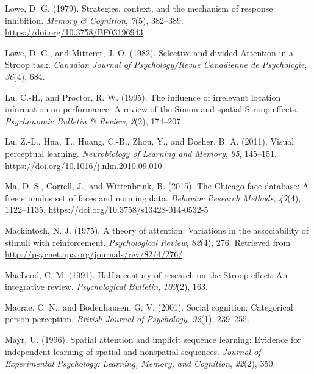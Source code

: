 \documentclass[]{DissertateCUNY}
\begin{document}
\leavevmode\hypertarget{ref-lowe_strategies_1979}{}%
Lowe, D. G. (1979). Strategies, context, and the mechanism of response
inhibition. \emph{Memory \& Cognition}, \emph{7}(5), 382--389.
\url{https://doi.org/10.3758/BF03196943}

\leavevmode\hypertarget{ref-lowe_selective_1982}{}%
Lowe, D. G., and Mitterer, J. O. (1982). Selective and divided Attention
in a Stroop task. \emph{Canadian Journal of Psychology/Revue Canadienne
de Psychologie}, \emph{36}(4), 684.

\leavevmode\hypertarget{ref-lu_influence_1995}{}%
Lu, C.-H., and Proctor, R. W. (1995). The influence of irrelevant
location information on performance: A review of the Simon and spatial
Stroop effects. \emph{Psychonomic Bulletin \& Review}, \emph{2}(2),
174--207.

\leavevmode\hypertarget{ref-lu_visual_2011}{}%
Lu, Z.-L., Hua, T., Huang, C.-B., Zhou, Y., and Dosher, B. A. (2011).
Visual perceptual learning. \emph{Neurobiology of Learning and Memory},
\emph{95}, 145--151. \url{https://doi.org/10.1016/j.nlm.2010.09.010}

\leavevmode\hypertarget{ref-ma_chicago_2015}{}%
Ma, D. S., Correll, J., and Wittenbrink, B. (2015). The Chicago face
database: A free stimulus set of faces and norming data. \emph{Behavior
Research Methods}, \emph{47}(4), 1122--1135.
\url{https://doi.org/10.3758/s13428-014-0532-5}

\leavevmode\hypertarget{ref-mackintosh_theory_1975}{}%
Mackintosh, N. J. (1975). A theory of attention: Variations in the
associability of stimuli with reinforcement. \emph{Psychological
Review}, \emph{82}(4), 276. Retrieved from
\url{http://psycnet.apa.org/journals/rev/82/4/276/}

\leavevmode\hypertarget{ref-macleod_half_1991}{}%
MacLeod, C. M. (1991). Half a century of research on the Stroop effect:
An integrative review. \emph{Psychological Bulletin}, \emph{109}(2),
163.

\leavevmode\hypertarget{ref-macrae_social_2001}{}%
Macrae, C. N., and Bodenhausen, G. V. (2001). Social cognition:
Categorical person perception. \emph{British Journal of Psychology},
\emph{92}(1), 239--255.

\leavevmode\hypertarget{ref-mayr_spatial_1996}{}%
Mayr, U. (1996). Spatial attention and implicit sequence learning:
Evidence for independent learning of spatial and nonspatial sequences.
\emph{Journal of Experimental Psychology: Learning, Memory, and
Cognition}, \emph{22}(2), 350.
\end{document}
